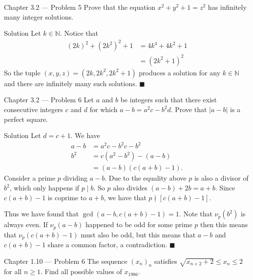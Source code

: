 \documentclass{article}
\begin{document}
\begin{problem}{Chapter 3.2 --- Problem 5}
Prove that the equation $x^2 + y^2 + 1 = z^2$ has infinitely many integer
solutions.
\end{problem}

\begin{solution}{Solution}
Let $k \in \mathbb{N}$. Notice that
\[
\begin{aligned}
(2k)^2 + (2k^2)^2 + 1 &= 4k^4 + 4k^2 + 1 \\
&= (2k^2 + 1)^2
\end{aligned}
\]
So the tuple $(x,y,z) = (2k, 2k^2, 2k^2 + 1)$ produces a solution for
any $k \in \mathbb{N}$ and there are infinitely many such solutions.
$\blacksquare$
\end{solution}
\newpage

\begin{problem}{Chapter 3.2 --- Problem 6}
Let $a$ and $b$ be integers such that there exist consecutive integers
$c$ and $d$ for which $a-b = a^2 c - b^2 d$. Prove that $|a-b|$ is a
perfect square.
\end{problem}

\begin{solution}{Solution}
Let $d = c+1$. We have
\[
\begin{aligned}
a-b &= a^2 c - b^2 c - b^2 \\
b^2 &= c(a^2 - b^2) - (a-b)\\
&= (a-b)(c(a+b)-1).
\end{aligned}
\]
Consider a prime $p$ dividing $a-b$. Due to the equality above $p$ is
also a divisor of $b^2$, which only happens if $p \mid b$.
So $p$ also divides $(a-b) + 2b = a+b$. Since $c(a+b) - 1$ is coprime to
$a+b$, we have that $p \nmid [c(a+b) - 1]$. \vspace{0.2cm}

Thus we have found that $\gcd(a-b, c(a+b)-1) = 1$. Note that
$\nu_p(b^2)$ is always even. If $\nu_p(a-b)$ happened to be odd for some
prime $p$ then this means that $\nu_p(c(a+b)-1)$ must also be odd, but
this means that $a-b$ and $c(a+b)-1$ share a common factor, a contradiction.
$\blacksquare$
\end{solution}
\newpage

\begin{problem}{Chapter 1.10 --- Problem 6}
The sequence $(x_n)_n$ satisfies $\sqrt{x_{n+2} + 2} \leq x_n \leq 2$
for all $n \geq 1$. Find all possible values of $x_{1986}$.
\end{problem}
\end{document}
